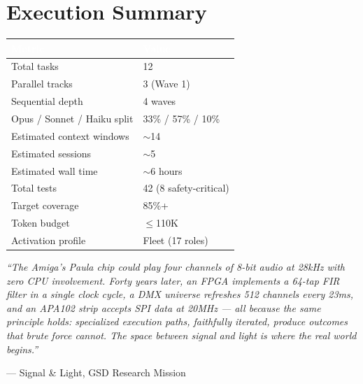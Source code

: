 \documentclass[11pt,letterpaper]{article}
\newcommand{\tableheader}[1]{\textbf{\sffamily\textcolor{white}{#1}}}
\begin{document}
\section{Execution Summary}

\begin{center}
\begin{tabularx}{\textwidth}{L{5cm}X}
\toprule
{}
\tableheader{Metric} & \tableheader{Value} \\
\midrule
Total tasks & 12 \\
Parallel tracks & 3 (Wave 1) \\
Sequential depth & 4 waves \\
Opus / Sonnet / Haiku split & 33\% / 57\% / 10\% \\
Estimated context windows & $\sim$14 \\
Estimated sessions & $\sim$5 \\
Estimated wall time & $\sim$6 hours \\
Total tests & 42 (8 safety-critical) \\
Target coverage & 85\%+ \\
Token budget & $\leq$110K \\
Activation profile & Fleet (17 roles) \\
\bottomrule
\end{tabularx}
\end{center}

\vspace{1em}

\begin{quotebox}
\textit{``The Amiga's Paula chip could play four channels of 8-bit audio at 28kHz with zero CPU involvement. Forty years later, an FPGA implements a 64-tap FIR filter in a single clock cycle, a DMX universe refreshes 512 channels every 23ms, and an APA102 strip accepts SPI data at 20MHz --- all because the same principle holds: specialized execution paths, faithfully iterated, produce outcomes that brute force cannot. The space between signal and light is where the real world begins.''}

\vspace{0.5em}
\hfill--- Signal \& Light, GSD Research Mission
\end{quotebox}
\end{document}
